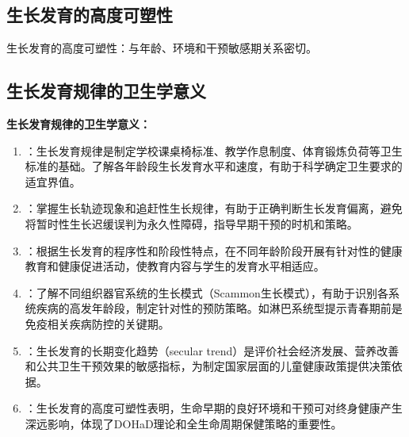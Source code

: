 \subsection{生长发育的高度可塑性}

\begin{defbox}
生长发育的高度可塑性：与年龄、环境和干预敏感期关系密切。
\end{defbox}

\subsection{生长发育规律的卫生学意义}

\begin{keybox}
\textbf{生长发育规律的卫生学意义：}

\begin{enumerate}[leftmargin=*]
    \item {}：生长发育规律是制定学校课桌椅标准、教学作息制度、体育锻炼负荷等卫生标准的基础。了解各年龄段生长发育水平和速度，有助于科学确定卫生要求的适宜界值。

    \item {}：掌握生长轨迹现象和追赶性生长规律，有助于正确判断生长发育偏离，避免将暂时性生长迟缓误判为永久性障碍，指导早期干预的时机和策略。

    \item {}：根据生长发育的程序性和阶段性特点，在不同年龄阶段开展有针对性的健康教育和健康促进活动，使教育内容与学生的发育水平相适应。

    \item {}：了解不同组织器官系统的生长模式（Scammon生长模式），有助于识别各系统疾病的高发年龄段，制定针对性的预防策略。如淋巴系统型提示青春期前是免疫相关疾病防控的关键期。

    \item {}：生长发育的长期变化趋势（secular trend）是评价社会经济发展、营养改善和公共卫生干预效果的敏感指标，为制定国家层面的儿童健康政策提供决策依据。

    \item {}：生长发育的高度可塑性表明，生命早期的良好环境和干预可对终身健康产生深远影响，体现了DOHaD理论和全生命周期保健策略的重要性。
\end{enumerate}
\end{keybox}


